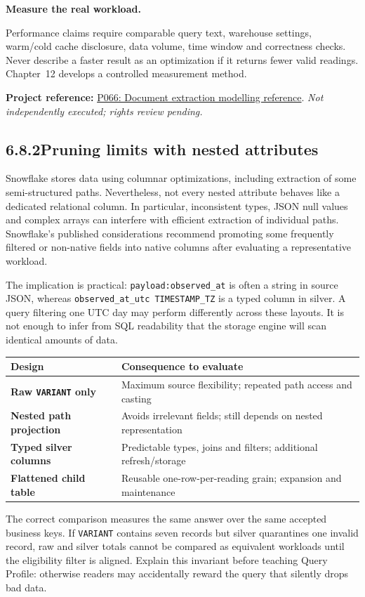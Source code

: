 \documentclass[11pt,twoside]{article}
\newcommand{\topic}[2]{\subsection*{#1\quad #2}}
\newcommand{\repo}[2]{\par\begingroup\fontsize{8.0}{9.6}\selectfont\sffamily\color{inkgray}\textbf{Project reference:} \href{#2}{#1}. \textit{Not independently executed; rights review pending.}\par\endgroup}
\begin{document}
\begin{insight}\textbf{Measure the real workload.}\par
Performance claims require comparable query text, warehouse settings, warm/cold cache disclosure, data volume, time window and correctness checks. Never describe a faster result as an optimization if it returns fewer valid readings. Chapter~12 develops a controlled measurement method.\end{insight}
\repo{P066: Document extraction modelling reference}{https://github.com/Snowflake-Labs/sfguide-document-ai-invoice-reconciliation}
\newpage
\topic{6.8.2}{Pruning limits with nested attributes}
Snowflake stores data using columnar optimizations, including extraction of some semi-structured paths. Nevertheless, not every nested attribute behaves like a dedicated relational column. In particular, inconsistent types, JSON null values and complex arrays can interfere with efficient extraction of individual paths. Snowflake's published considerations recommend promoting some frequently filtered or non-native fields into native columns after evaluating a representative workload.

The implication is practical: \texttt{payload:observed\_at} is often a string in source JSON, whereas \texttt{observed\_at\_utc TIMESTAMP\_TZ} is a typed column in silver. A query filtering one UTC day may perform differently across these layouts. It is not enough to infer from SQL readability that the storage engine will scan identical amounts of data.

\begin{center}\small\begin{tabularx}{\linewidth}{@{}>{\bfseries}p{31mm}X@{}}\toprule
Design & Consequence to evaluate\\\midrule
Raw \texttt{VARIANT} only & Maximum source flexibility; repeated path access and casting\\
Nested path projection & Avoids irrelevant fields; still depends on nested representation\\
Typed silver columns & Predictable types, joins and filters; additional refresh/storage\\
Flattened child table & Reusable one-row-per-reading grain; expansion and maintenance\\\bottomrule\end{tabularx}\end{center}

The correct comparison measures the same answer over the same accepted business keys. If \texttt{VARIANT} contains seven records but silver quarantines one invalid record, raw and silver totals cannot be compared as equivalent workloads until the eligibility filter is aligned. Explain this invariant before teaching Query Profile: otherwise readers may accidentally reward the query that silently drops bad data.
\end{document}

